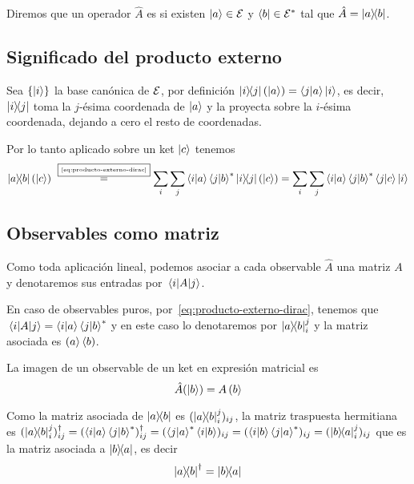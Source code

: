 \begin{definition}
	Diremos que un operador $\hat{A}$ es  si existen $\ket{a}\in\mathcal{E}$ y $\bra{b}\in\mathcal{E}^*$ tal que $\hat{A}=\ketbra{a}{b}$.
\end{definition}

\subsection{Significado del producto externo}\label{subsec:significado-del-producto-externo}

Sea $\qty{\ket{i}}$ la base canónica de $\mathcal{E}$, por definición $\ketbra{i}{j}\left(\ket{a}\right)=\braket{j}{a}\ket{i}$, es decir, $\ketbra{i}{j}$ toma la $j$-ésima coordenada de $\ket{a}$ y la proyecta sobre la $i$-ésima coordenada, dejando a cero el resto de coordenadas.

Por lo tanto aplicado sobre un ket $\ket{c}$ tenemos
\begin{equation}
	\label{eq:producto-externo-ket-coordenadas}
	\ketbra{a}{b}\left( \ket{c} \right)~\overset{\fbox{\tiny \ref{eq:producto-externo-dirac}}}{=} \sum_{i}\sum_{j}\braket{i}{a}\braket{j}{b}^*\ketbra{i}{j}\left( \ket{c} \right)=\sum_{i}\sum_{j}\braket{i}{a}\braket{j}{b}^*\braket{j}{c}\ket{i}
\end{equation}

\subsection{Observables como matriz}\label{subsec:observables-como-matriz}
Como toda aplicación lineal, podemos asociar a cada observable $\hat{A}$ una matriz $A$ y denotaremos sus entradas por $\matrixelement{i}{A}{j}$.

En caso de observables puros, por~\eqref{eq:producto-externo-dirac}, tenemos que $\matrixelement{i}{A}{j}=\braket{i}{a}\braket{j}{b}^*$ y en este caso lo denotaremos por $\ketbra{a}{b}_{i}^{j}$ y la matriz asociada es $\left(a\right>\left<b\right)$.

La imagen de un observable de un ket en expresión matricial es
\begin{equation}
	\label{eq:imagen-observable-ket-matriz}
	\hat{A}(\ket{b})=A\left(b\right>
\end{equation}

Como la matriz asociada de $\ketbra{a}{b}$ es $(\ketbra{a}{b}_{i}^{j})_{ij}$, la matriz traspuesta hermitiana es $(\ketbra{a}{b}_{i}^{j})_{ij}^\dag = (\braket{i}{a}\braket{j}{b}^*)_{ij}^\dag=(\braket{j}{a}^*\braket{i}{b})_{ij}=(\braket{i}{b}\braket{j}{a}^*)_{ij}=(\ketbra{b}{a}_{i}^{j})_{ij}$ que es la matriz asociada a $\ketbra{b}{a}$, es decir
\begin{equation}
	\label{eq:traspuesta-hermitiana-producto-externo}
	\ketbra{a}{b}^\dag = \ketbra{b}{a}
\end{equation}

